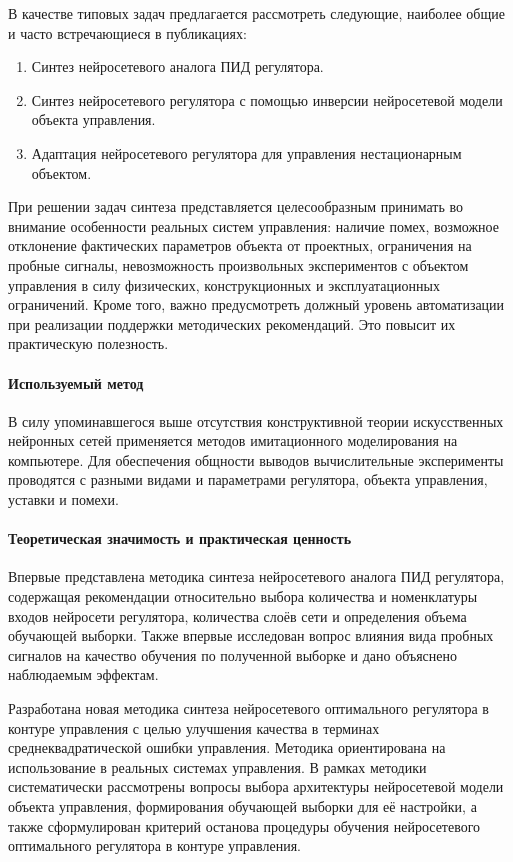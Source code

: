 В качестве типовых задач предлагается рассмотреть следующие, наиболее
общие и часто встречающиеся в публикациях:
\begin{enumerate}
\item Синтез нейросетевого аналога ПИД регулятора.
\item Синтез нейросетевого регулятора с помощью инверсии нейросетевой
  модели объекта управления.
\item Адаптация нейросетевого регулятора для управления нестационарным
  объектом.
\end{enumerate}

При решении задач синтеза представляется целесообразным принимать во
внимание особенности реальных систем управления: наличие помех,
возможное отклонение фактических параметров объекта от проектных,
ограничения на пробные сигналы, невозможность произвольных
экспериментов с объектом управления в силу физических, конструкционных
и эксплуатационных ограничений.  Кроме того, важно предусмотреть
должный уровень автоматизации при реализации поддержки методических
рекомендаций.  Это повысит их практическую полезность.

\paragraph{Используемый метод}

В силу упоминавшегося выше отсутствия конструктивной теории
искусственных нейронных сетей применяется методов имитационного
моделирования на компьютере.  Для обеспечения общности выводов
вычислительные эксперименты проводятся с разными видами и параметрами
регулятора, объекта управления, уставки и помехи.

\paragraph{Теоретическая значимость и практическая ценность}

Впервые представлена методика синтеза нейросетевого аналога ПИД
регулятора, содержащая рекомендации относительно выбора количества и
номенклатуры входов нейросети регулятора, количества слоёв сети и
определения объема обучающей выборки.  Также впервые исследован вопрос
влияния вида пробных сигналов на качество обучения по полученной
выборке и дано объяснено наблюдаемым эффектам.

Разработана новая методика синтеза нейросетевого оптимального
регулятора в контуре управления с целью улучшения качества в терминах
среднеквадратической ошибки управления.  Методика ориентирована на
использование в реальных системах управления.  В рамках методики
систематически рассмотрены вопросы выбора архитектуры нейросетевой
модели объекта управления, формирования обучающей выборки для её
настройки, а также сформулирован критерий останова процедуры обучения
нейросетевого оптимального регулятора в контуре управления.

